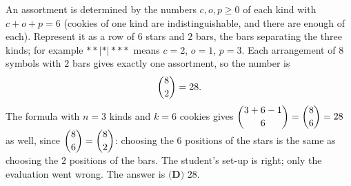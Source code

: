 An assortment is determined by the numbers $c,o,p\ge0$ of each kind with $c+o+p=6$ (cookies of one kind are indistinguishable, and there are enough of each). Represent it as a row of $6$ stars and $2$ bars, the bars separating the three kinds; for example $**|*|***$ means $c=2$, $o=1$, $p=3$. Each arrangement of $8$ symbols with $2$ bars gives exactly one assortment, so the number is
\[
\dbinom{8}{2}=28 .
\]
The formula with $n=3$ kinds and $k=6$ cookies gives $\dbinom{3+6-1}{6}=\dbinom{8}{6}=28$ as well, since $\dbinom{8}{6}=\dbinom{8}{2}$: choosing the $6$ positions of the stars is the same as choosing the $2$ positions of the bars. The student's set-up is right; only the evaluation went wrong. The answer is $\boxed{\textbf{(D) }28}$.
